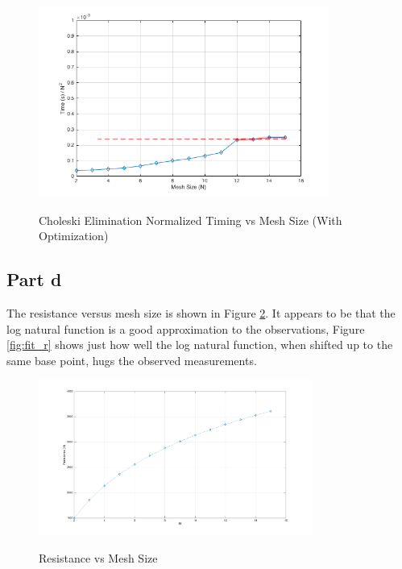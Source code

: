 \documentclass[11pt]{amsart}
\begin{document}
\begin{center}
	\begin{figure}[h]
		\caption{Choleski Elimination Normalized Timing vs Mesh Size (With Optimization)}
		\includegraphics[width=0.85\textwidth]{assets/normalized_time_vs_n_opt.png}\label{fig:norm_t_n_opt}
	\end{figure}
\end{center}

\subsection*{Part d} The resistance versus mesh size is shown in Figure \ref{fig:r_n_opt}. It appears to be that the log natural function is a good approximation to the observations, Figure \ref{fig:fit_r} shows just how well the log natural function, when shifted up to the same base point, hugs the observed measurements. 

\begin{center}
	\begin{figure}[h]
		\caption{Resistance vs Mesh Size}
		\includegraphics[width=0.8\textwidth]{assets/n_vs_r_unopt.png}\label{fig:r_n_opt}
	\end{figure}
\end{center}
\end{document}
